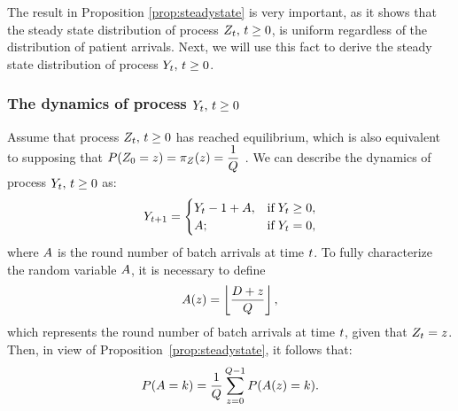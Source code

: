 The result in Proposition \ref{prop:steadystate} is very important, as it shows that the steady state distribution of process $Z_{t}, \, t \ge 0$, is uniform regardless of the distribution of patient arrivals. Next, we will use this fact to derive the steady state distribution of process $Y_{t}, \, t \ge 0$. 

\subsubsection{The dynamics of process $Y_{t}, \, t \ge 0$\label{sec:batchprocess}}

Assume that process $Z_{t}, \, t \ge 0$ has reached equilibrium, which is also equivalent to supposing that $P(Z_{0} = z) = \pi_{Z_{}}(z) = \dfrac{1}{Q}$ \citep[e.g.,][]{Bremaud2020}. We can describe the dynamics of process $Y_{t}, \, t \ge 0$ as:
%
\begin{equation} \label{eq:dynY}
Y_{t+1} = \begin{cases}
Y_{t} - 1 + A, & \text{if} \; Y_{t} \ge 0, \\
A; \; & \text{if} \; Y_{t} = 0,
\end{cases}
\end{equation}
%
where $A$ is the round number of batch arrivals at time $t$. To fully characterize the random variable $A$, it is necessary to define
%
\begin{equation} \label{eq:Az}
A(z) = \left \lfloor \dfrac{D + z}{Q} \right \rfloor,
\end{equation}
%
which represents the round number of batch arrivals at time $t$, given that $Z_{t} = z$. Then, in view of Proposition~\ref{prop:steadystate}, it follows that:
%
\begin{equation} \label{eq:batcharr}
P(A = k ) = \dfrac{1}{Q} \sum_{z=0}^{Q-1} P(A(z) = k ).    
\end{equation}

